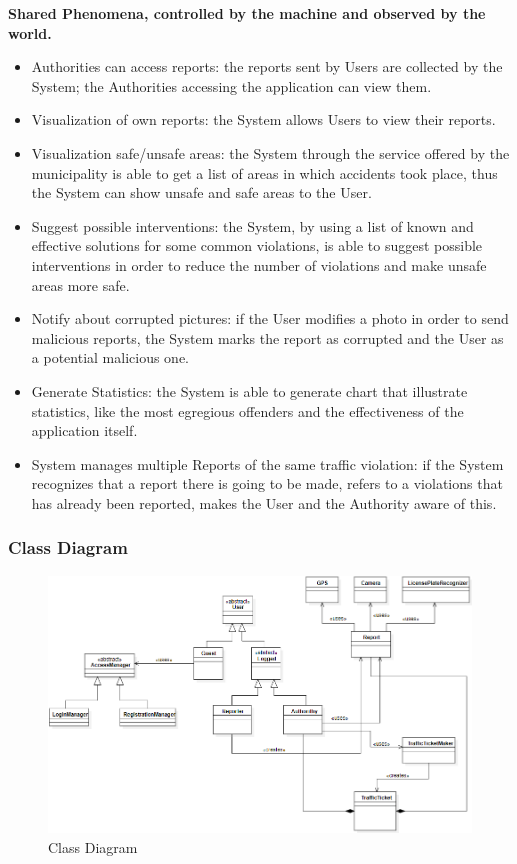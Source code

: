     \noindent\textbf{Shared Phenomena, controlled by the machine and observed by the world.}
      \begin{itemize}
          \item Authorities can access reports: the reports sent by Users are collected by the System; the Authorities accessing the application can view them.
          \item Visualization of own reports: the System allows Users to view their reports.
          \item Visualization safe/unsafe areas: the System through the service offered by the municipality is able to get a list of areas in which accidents took place, thus the System can show unsafe and safe areas to the User.
          \item Suggest possible interventions: the System,  by using a list of known and effective solutions for some common violations, is able to suggest possible interventions in order to reduce the number of violations and make unsafe areas more safe.
          \item Notify about corrupted pictures: if the User modifies a photo in order to send malicious reports, the System marks the report as corrupted and the User as a potential malicious one.
          \item Generate Statistics: the System is able to generate chart that illustrate statistics, like the most egregious offenders and the effectiveness of the application itself.
          \item System manages multiple Reports of the same traffic violation: if the System recognizes that a report there is going to be made, refers to a violations that has already been reported, makes the User and the Authority aware of this.
          \end{itemize}
          

\vspace{40px}      

\subsubsection{Class Diagram}
    \begin{figure}[h]
        \centering
        \includegraphics[scale=0.5]{Images/ClassDiag.png}
        \caption{Class Diagram}
    \end{figure}

